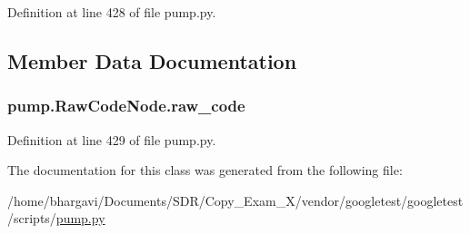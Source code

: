 Definition at line 428 of file pump.\+py.



\subsection{Member Data Documentation}
\subsubsection[{\texorpdfstring{raw\+\_\+code}{raw_code}}]{\setlength{\rightskip}{0pt plus 5cm}pump.\+Raw\+Code\+Node.\+raw\+\_\+code}\hypertarget{classpump_1_1_raw_code_node_ab36224d959e0d8f803e9fac8e6a0baab}{}\label{classpump_1_1_raw_code_node_ab36224d959e0d8f803e9fac8e6a0baab}


Definition at line 429 of file pump.\+py.



The documentation for this class was generated from the following file\+:\begin{DoxyCompactItemize}
\item 
/home/bhargavi/\+Documents/\+S\+D\+R/\+Copy\+\_\+\+Exam\+\_\+X/vendor/googletest/googletest/scripts/\hyperlink{pump_8py}{pump.\+py}\end{DoxyCompactItemize}

